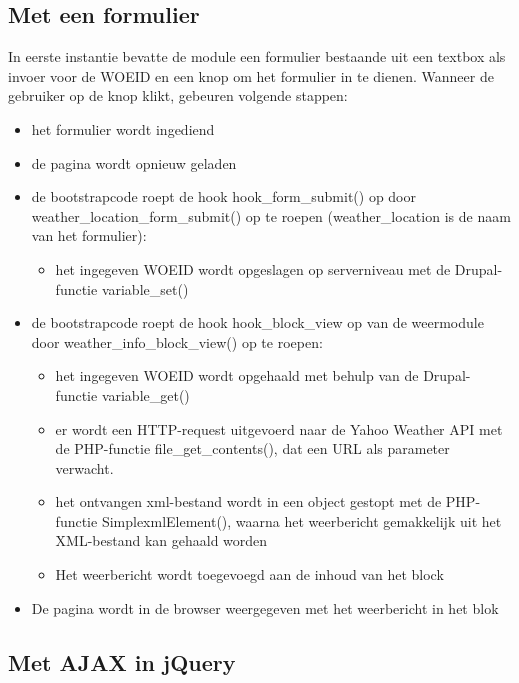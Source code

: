 \subsection{Met een formulier}

In eerste instantie bevatte de module een formulier bestaande uit een textbox als invoer voor de WOEID en een knop om het formulier in te dienen.
Wanneer de gebruiker op de knop klikt, gebeuren volgende stappen:

\begin{itemize}
	\item het formulier wordt ingediend
	\item de pagina wordt opnieuw geladen
	\item de bootstrapcode roept de hook hook\_form\_submit() op door weather\_location\_form\_submit() op te roepen (weather\_location is de naam van het formulier):
	\begin{itemize}
		\item het ingegeven WOEID wordt opgeslagen op serverniveau met de Drupal-functie variable\_set()
	\end{itemize}
	\item de bootstrapcode roept de hook hook\_block\_view op van de weermodule door weather\_info\_block\_view() op te roepen:
	\begin{itemize}
		\item het ingegeven WOEID wordt opgehaald met behulp van de Drupal-functie variable\_get()
		\item er wordt een HTTP-request uitgevoerd naar de Yahoo Weather API met de PHP-functie file\_get\_contents(), dat een URL als parameter verwacht.
		\item het ontvangen xml-bestand wordt in een object gestopt met de PHP-functie SimplexmlElement(), waarna het weerbericht gemakkelijk uit het XML-bestand kan gehaald worden
		\item Het weerbericht wordt toegevoegd aan de inhoud van het block
	\end{itemize}
	\item De pagina wordt in de browser weergegeven met het weerbericht in het blok
\end{itemize}

\subsection{Met AJAX in jQuery}

